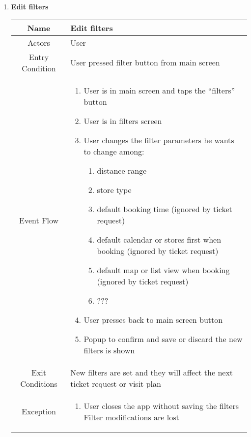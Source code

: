 \begin{enumerate}
\begin{table}[H]
{\begin{tabular}{|c|p{14cm}|}
\begin{enumerate}
			\end{enumerate}\\
			
			\hline
		\end{tabular}
	}
\end{table}

\item \textbf{Edit filters}

\begin{table}[H]
	{
		\begin{tabular}{|c|p{14cm}|}
			\hline
			Name & Edit filters\\
			\hline
			Actors & User\\
			\hline
			Entry Condition & User pressed filter button from main screen\\
			\hline
			
			Event Flow & \begin{enumerate}
				\item User is in main screen and taps the “filters” button
				\item User is in filters screen
				\item User changes the filter parameters he wants to change among:
				\begin{enumerate}
					\item distance range
					\item store type
					\item default booking time (ignored by ticket request)
					\item default calendar or stores first when booking (ignored by ticket request)
					\item default map or list view when booking (ignored by ticket request)
					\item ???
				\end{enumerate}
				
				\item User presses back to main screen button
				\item Popup to confirm and save or discard the new filters is shown 
				
			\end{enumerate}\\
			
			\hline
			Exit Conditions & New filters are set and they will affect the next ticket request or visit plan\\
			\hline
			
			Exception & \begin{enumerate}
				\item User closes the app without saving the filters\newline
				Filter modifications are lost
				

\end{enumerate}
\end{tabular}}
\end{table}
\end{enumerate}
